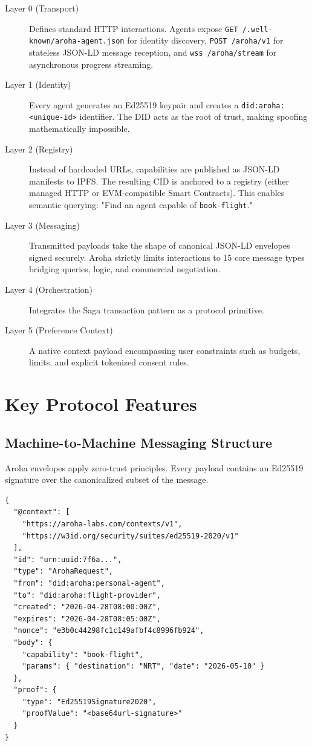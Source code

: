 \documentclass[11pt,a4paper]{article}
\begin{document}
\begin{description}
    \item[Layer 0 (Transport)] Defines standard HTTP interactions. Agents expose \texttt{GET /.well-known/aroha-agent.json} for identity discovery, \texttt{POST /aroha/v1} for stateless JSON-LD message reception, and \texttt{wss /aroha/stream} for asynchronous progress streaming.
    \item[Layer 1 (Identity)] Every agent generates an Ed25519 keypair and creates a \texttt{did:aroha:<unique-id>} identifier. The DID acts as the root of trust, making spoofing mathematically impossible.
    \item[Layer 2 (Registry)] Instead of hardcoded URLs, capabilities are published as JSON-LD manifests to IPFS. The resulting CID is anchored to a registry (either managed HTTP or EVM-compatible Smart Contracts). This enables semantic querying: "Find an agent capable of \texttt{book-flight}."
    \item[Layer 3 (Messaging)] Transmitted payloads take the shape of canonical JSON-LD envelopes signed securely. Aroha strictly limits interactions to 15 core message types bridging queries, logic, and commercial negotiation.
    \item[Layer 4 (Orchestration)] Integrates the Saga transaction pattern as a protocol primitive.
    \item[Layer 5 (Preference Context)] A native context payload encompassing user constraints such as budgets, limits, and explicit tokenized consent rules.
\end{description}

\section{Key Protocol Features}

\subsection{Machine-to-Machine Messaging Structure}
Aroha envelopes apply zero-trust principles. Every payload contains an Ed25519 signature over the canonicalized subset of the message. 

\begin{lstlisting}[caption=Example Signed Aroha Envelope, basicstyle=\ttfamily\small]
{
  "@context": [
    "https://aroha-labs.com/contexts/v1",
    "https://w3id.org/security/suites/ed25519-2020/v1"
  ],
  "id": "urn:uuid:7f6a...",
  "type": "ArohaRequest",
  "from": "did:aroha:personal-agent",
  "to": "did:aroha:flight-provider",
  "created": "2026-04-28T08:00:00Z",
  "expires": "2026-04-28T08:05:00Z",
  "nonce": "e3b0c44298fc1c149afbf4c8996fb924",
  "body": {
    "capability": "book-flight",
    "params": { "destination": "NRT", "date": "2026-05-10" }
  },
  "proof": {
    "type": "Ed25519Signature2020",
    "proofValue": "<base64url-signature>"
  }
}
\end{lstlisting}
\end{document}

